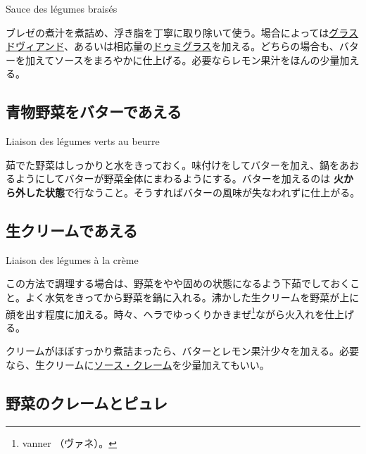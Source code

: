 \begin{main}
\begin{frsecbenv}

Sauce des légumes braisés

\end{frsecbenv}

ブレゼの煮汁を煮詰め、浮き脂を丁寧に取り除いて使う。場合によっては\protect\hyperlink{glace-de-viande}{グラスドヴィアンド}、あるいは相応量の\protect\hyperlink{sauce-demi-glace}{ドゥミグラス}を加える。どちらの場合も、バターを加えてソースをまろやかに仕上げる。必要ならレモン果汁をほんの少量加える。

\hypertarget{liaison-des-legumes-vert-au-beurre}{%
\subsection{青物野菜をバターであえる}\label{liaison-des-legumes-vert-au-beurre}}

\begin{frsecbenv}

Liaison des légumes verts au beurre

\end{frsecbenv}

茹でた野菜はしっかりと水をきっておく。味付けをしてバターを加え、鍋をあおるようにしてバターが野菜全体にまわるようにする。バターを加えるのは\textbf{
火から外した状態}で行なうこと。そうすればバターの風味が失なわれずに仕上がる。

\hypertarget{liaison-des-legumes-a-la-creme}{%
\subsection{生クリームであえる}\label{liaison-des-legumes-a-la-creme}}

\begin{frsecbenv}

Liaison des légumes à la crème

\end{frsecbenv}

この方法で調理する場合は、野菜をやや固めの状態になるよう下茹でしておくこと。よく水気をきってから野菜を鍋に入れる。沸かした生クリームを野菜が上に顔を出す程度に加える。時々、ヘラでゆっくりかきまぜ\footnote{vanner
  （ヴァネ）。}ながら火入れを仕上げる。

クリームがほぼすっかり煮詰まったら、バターとレモン果汁少々を加える。必要なら、生クリームに\protect\hyperlink{sauce-creme}{ソース・クレーム}を少量加えてもいい。

\hypertarget{cremes-et-puree-de-legumes}{%
\subsection{野菜のクレームとピュレ}\label{cremes-et-puree-de-legumes}}


\end{main}
